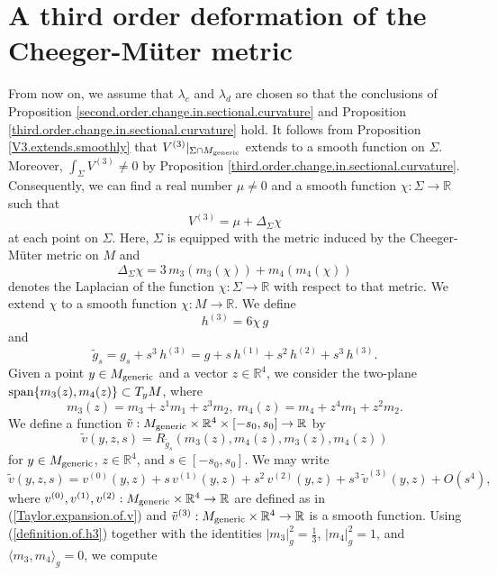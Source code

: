 \documentclass[11pt]{amsart}
\theoremstyle{definition}
\begin{document}
\section{A third order deformation of the Cheeger-M\"uter metric}

\label{third.order.deformation}

From now on, we assume that $\lambda_c$ and $\lambda_d$ are chosen so that the conclusions of Proposition \ref{second.order.change.in.sectional.curvature} and Proposition \ref{third.order.change.in.sectional.curvature} hold. It follows from Proposition \ref{V3.extends.smoothly} that $V^{(3)}|_{\Sigma \cap M_{\text{\rm generic}}}$ extends to a smooth function on $\Sigma$. Moreover, $\int_\Sigma V^{(3)} \neq 0$ by Proposition \ref{third.order.change.in.sectional.curvature}. Consequently, we can find a real number $\mu \neq 0$ and a smooth function $\chi: \Sigma \to \mathbb{R}$ such that 
\begin{equation} 
\label{pde.for.chi}
V^{(3)} = \mu + \Delta_\Sigma \chi 
\end{equation}
at each point on $\Sigma$. Here, $\Sigma$ is equipped with the metric induced by the Cheeger-M\"uter metric on $M$ and 
\[\Delta_\Sigma \chi = 3 \, m_3(m_3(\chi)) + m_4(m_4(\chi))\] 
denotes the Laplacian of the function $\chi: \Sigma \to \mathbb{R}$ with respect to that metric. We extend $\chi$ to a smooth function $\chi: M \to \mathbb{R}$. We define 
\begin{equation} 
\label{definition.of.h3}
h^{(3)} = 6\chi \, g 
\end{equation} 
and 
\[\tilde{g}_s = g_s + s^3 \, h^{(3)} = g + s \, h^{(1)} + s^2 \, h^{(2)} + s^3 \, h^{(3)}.\]
Given a point $y \in M_{\text{\rm generic}}$ and a vector $z \in \mathbb{R}^4$, we consider the two-plane $\text{\rm span}\{m_3(z),m_4(z)\} \subset T_y M$, where 
\[ m_3(z)=m_3+z^1 m_1+z^3 m_2,\ m_4(z)=m_4+z^4 m_1+z^2 m_2. \] 
We define a function $\tilde{v}: M_{\text{\rm generic}} \times \mathbb{R}^4 \times [-s_0,s_0] \to \mathbb{R}$ by 
\[\tilde{v}(y,z,s) = R_{\tilde{g}_s}(m_3(z),m_4(z),m_3(z),m_4(z))\] 
for $y \in M_{\text{\rm generic}}$, $z \in \mathbb{R}^4$, and $s \in [-s_0,s_0]$. We may write 
\[\tilde{v}(y,z,s) = v^{(0)}(y,z) + s \, v^{(1)}(y,z) + s^2 \, v^{(2)}(y,z) + s^3 \, \tilde{v}^{(3)}(y,z) + O(s^4),\] 
where $v^{(0)},v^{(1)},v^{(2)}: M_{\text{\rm generic}} \times \mathbb{R}^4 \to \mathbb{R}$ are defined as in (\ref{Taylor.expansion.of.v}) and $\tilde{v}^{(3)}: M_{\text{\rm generic}} \times \mathbb{R}^4 \to \mathbb{R}$ is a smooth function. Using (\ref{definition.of.h3}) together with the identities $|m_3|_g^2 = \frac{1}{3}$, $|m_4|_g^2 = 1$, and $\langle m_3,m_4 \rangle_g = 0$, we compute 
\end{document}
